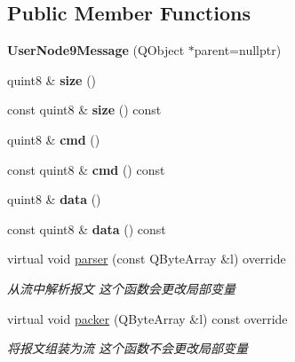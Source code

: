 \subsection*{Public Member Functions}
\begin{DoxyCompactItemize}
\item 
\mbox{\label{class_user_node9_message_a0c57ac80ad69c48e4e7ba6fe69e9dda7}} 
{\bfseries User\+Node9\+Message} (Q\+Object $\ast$parent=nullptr)
\item 
\mbox{\label{class_user_node9_message_a09022ebd06b51dac70c5307876c6c69b}} 
quint8 \& {\bfseries size} ()
\item 
\mbox{\label{class_user_node9_message_aa1a4d15accdcb92a1bf6cf7631ced571}} 
const quint8 \& {\bfseries size} () const
\item 
\mbox{\label{class_user_node9_message_a0b9fbce752fa8964e78cbbc4575ce763}} 
quint8 \& {\bfseries cmd} ()
\item 
\mbox{\label{class_user_node9_message_a97ae4830ebc50f4fd890080d79bb91ff}} 
const quint8 \& {\bfseries cmd} () const
\item 
\mbox{\label{class_user_node9_message_a1ea1e38a9cbc8dd0e462733611da3eaf}} 
quint8 \& {\bfseries data} ()
\item 
\mbox{\label{class_user_node9_message_aab82a89a00780cd89ed008db049e9ced}} 
const quint8 \& {\bfseries data} () const
\item 
virtual void \mbox{\hyperlink{class_user_node9_message_a77088d56f6b1f98e9fdcde83de5780e7}{parser}} (const Q\+Byte\+Array \&l) override
\begin{DoxyCompactList}\small\item\em 从流中解析报文 这个函数会更改局部变量 \end{DoxyCompactList}\item 
virtual void \mbox{\hyperlink{class_user_node9_message_afab1c33ef6cc9ed0f0dff1adc24a156c}{packer}} (Q\+Byte\+Array \&l) const override
\begin{DoxyCompactList}\small\item\em 将报文组装为流 这个函数不会更改局部变量 \end{DoxyCompactList}\end{DoxyCompactItemize}


